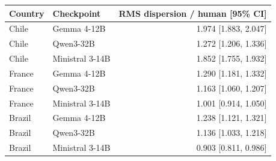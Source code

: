 \begin{tabular}{llr}
\toprule
Country & Checkpoint & RMS dispersion / human [95\% CI] \\
\midrule
Chile & Gemma 4-12B & 1.974 [1.883, 2.047] \\
Chile & Qwen3-32B & 1.272 [1.206, 1.336] \\
Chile & Ministral 3-14B & 1.852 [1.755, 1.932] \\
France & Gemma 4-12B & 1.290 [1.181, 1.332] \\
France & Qwen3-32B & 1.163 [1.060, 1.207] \\
France & Ministral 3-14B & 1.001 [0.914, 1.050] \\
Brazil & Gemma 4-12B & 1.238 [1.121, 1.321] \\
Brazil & Qwen3-32B & 1.136 [1.033, 1.218] \\
Brazil & Ministral 3-14B & 0.903 [0.811, 0.986] \\
\bottomrule
\end{tabular}
